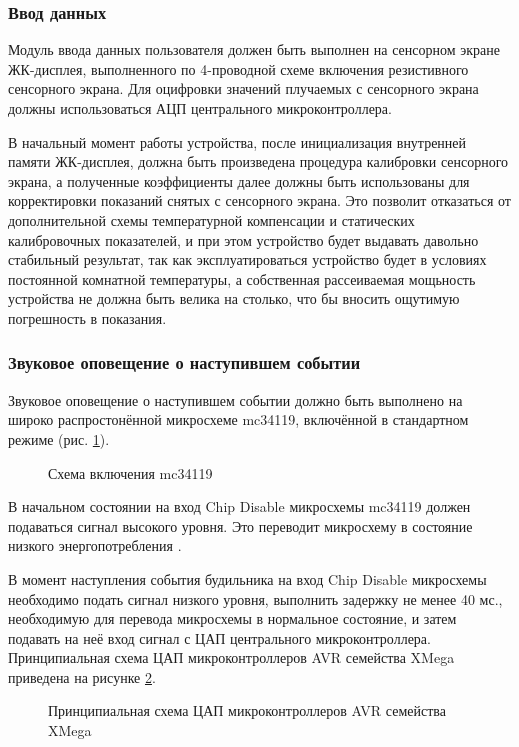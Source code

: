 \subsubsection{Ввод данных}
\begin{par}
Модуль ввода данных пользователя должен быть выполнен на сенсорном экране ЖК-дисплея,
выполненного по 4-проводной схеме включения резистивного сенсорного экрана. Для
оцифровки значений плучаемых с сенсорного экрана должны использоваться АЦП\cite{avradc} центрального
микроконтроллера.
\end{par}

\begin{par}
В начальный момент работы устройства, после инициализация внутренней памяти ЖК-дисплея, должна быть
произведена процедура калибровки сенсорного экрана, а полученные коэффициенты далее должны быть
использованы для корректировки показаний снятых с сенсорного экрана. Это позволит отказаться
от дополнительной схемы температурной компенсации и статических калибровочных показателей,
и при этом устройство будет выдавать давольно стабильный результат,
так как эксплуатироваться устройство будет в условиях постоянной комнатной температуры,
а собственная рассеиваемая мощьность устройства не должна быть велика на столько, что бы
вносить ощутимую погрешность в показания.
\end{par}


\subsubsection{Звуковое оповещение о наступившем событии}
\begin{par}
Звуковое оповещение о наступившем событии должно быть выполнено на широко распростонённой
микросхеме mc34119, включённой в стандартном режиме (рис. \ref{img:mc34119m}).
\begin{figure}[h]
	\caption{Схема включения mc34119}
	\label{img:mc34119m}
\end{figure}
\end{par}

\begin{par}
В начальном состоянии на вход Chip Disable микросхемы mc34119 должен подаваться сигнал высокого уровня.
Это переводит микросхему в состояние низкого энергопотребления \cite{mc34119}.
\end{par}

\begin{par}
В момент наступления события будильника на вход Chip Disable микросхемы необходимо подать сигнал 
низкого уровня, выполнить задержку не менее 40 мс., необходимую для перевода микросхемы в
нормальное состояние, и затем подавать на неё вход сигнал с ЦАП центрального микроконтроллера.
Принципиальная схема ЦАП микроконтроллеров AVR семейства XMega приведена на рисунке \ref{img:avrdacp}.
\begin{figure}[h]
	\caption{Принципиальная схема ЦАП микроконтроллеров AVR семейства XMega}
	\label{img:avrdacp}
\end{figure}
\end{par}


